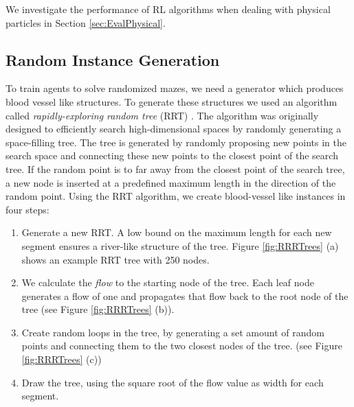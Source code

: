 We investigate the performance of RL algorithms when dealing with physical particles in Section \ref{sec:EvalPhysical}.

\subsection{Random Instance Generation} \label{sec:RandomInstanceGeneration}
To train agents to solve randomized mazes, we need a generator which produces blood vessel like structures. To generate these structures we used an algorithm called \textit{rapidly-exploring random tree} (RRT) \cite{lavalle1998rapidly}. The algorithm was originally designed to efficiently search high-dimensional spaces by randomly generating a space-filling tree. The tree is generated by randomly proposing new points in the search space and connecting these new points to the closest point of the search tree. If the random point is to far away from the closest point of the search tree, a new node is inserted at a predefined maximum length in the direction of the random point. Using the RRT algorithm, we create blood-vessel like instances in four steps:

\begin{enumerate}
    \item Generate a new RRT. A low bound on the maximum length for each new segment ensures a river-like structure of the tree. Figure \ref{fig:RRRTrees} (a) shows an example RRT tree with 250 nodes.
    \item We calculate the \textit{flow} to the starting node of the tree. Each leaf node generates a flow of one and propagates that flow back to the root node of the tree (see Figure \ref{fig:RRRTrees} (b)).
    \item Create random loops in the tree, by generating a set amount of random points and connecting them to the two closest nodes of the tree. (see Figure \ref{fig:RRRTrees} (c))
    \item Draw the tree, using the square root of the flow value as width for each segment.
\end{enumerate}

